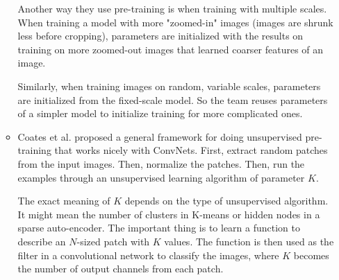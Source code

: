 \documentclass[a4paper]{article}
\begin{document}
\begin{enumerate}
\begin{itemize}
Another way they use pre-training is when training with multiple scales. When training a model with more "zoomed-in" images (images are shrunk less before cropping), parameters are initialized with the results on training on more zoomed-out images that learned coarser features of an image.

Similarly, when training images on random, variable scales, parameters are initialized from the fixed-scale model. So the team reuses parameters of a simpler model to initialize training for more complicated ones.

\item Coates et al. \cite{coates2010analysis} proposed a general framework for doing unsupervised pre-training that works nicely with ConvNets. First, extract random patches from the input images. Then, normalize the patches. Then, run the examples through an unsupervised learning algorithm of parameter $K$.

The exact meaning of $K$ depends on the type of unsupervised algorithm. It might mean the number of clusters in K-means or hidden nodes in a sparse auto-encoder. The important thing is to learn a function to describe an $N$-sized patch with $K$ values. The function is then used as the filter in a convolutional network to classify the images, where $K$ becomes the number of output channels from each patch.

\end{itemize}

\end{enumerate}



\end{document}
